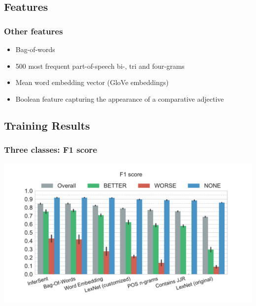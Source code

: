 \documentclass[11pt,aspectratio=169]{beamer}
\begin{document}
    \subsection{Features}

    \begin{frame}
        \frametitle{Other features}
        \begin{itemize}
            \item Bag-of-words
            \item 500 most frequent part-of-speech bi-, tri and four-grams
            \item Mean word embedding vector (GloVe embeddings)
            \item Boolean feature capturing the appearance of a comparative adjective
        \end{itemize}

    \end{frame}

    \subsection{Training Results}
    \begin{frame}
        \frametitle{Three classes: F1 score}
        \centerline{\includegraphics[scale=0.45,trim={0 0 0 0.5cm},clip]{images/experiments/p-f1-False}}
    \end{frame}
\end{document}
